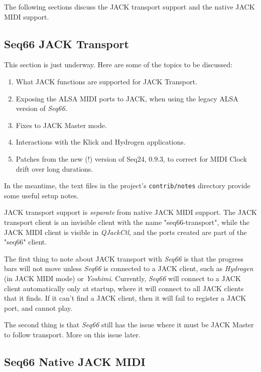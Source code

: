    The following sections discuss the JACK transport support and the native
   JACK MIDI support.

\subsection{Seq66 JACK Transport}
\label{subsec:jack_transport}

   This section is just underway.  Here are some of the topics to be discussed:

   \begin{enumerate}
      \item What JACK functions are supported for JACK Transport.
      \item Exposing the ALSA MIDI ports to JACK, when using the legacy
         ALSA version of \textsl{Seq66}.
      \item Fixes to JACK Master mode.
      \item Interactions with the Klick and Hydrogen applications.
      \item Patches from the new (!) version of Seq24, 0.9.3, to correct
         for MIDI Clock drift over long durations.
   \end{enumerate}

   In the meantime, the text files in the project's \texttt{contrib/notes}
   directory provide some useful setup notes.

   JACK transport support is \textsl{separate} from native JACK MIDI support.
   The JACK transport client is an invisible client with the
   name "seq66-transport", while the JACK MIDI client is visible in
   \textsl{QJackCtl}, and the ports created are part of the
   "seq66" client.

   The first thing to note about JACK transport with \textsl{Seq66} is
   that the progress bars will not move unless \textsl{Seq66} is
   connected to a JACK client, such as \textsl{Hydrogen} (in JACK MIDI mode)
   or \textsl{Yoshimi}.  Currently, \textsl{Seq66} will connect to a JACK
   client automatically only at startup, where it will connect to all JACK
   clients that it finds.  If it can't find a JACK client, then it will
   fail to register a JACK port, and cannot play.

   The second thing is that \textsl{Seq66} still has the issue where it
   must be JACK Master to follow transport.  More on this issue later.

\subsection{Seq66 Native JACK MIDI}
\label{subsec:jack_native_midi}

